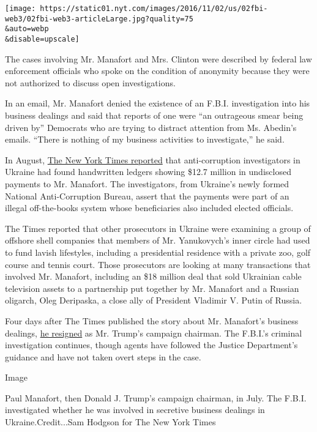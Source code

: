 \texttt{[image: https://static01.nyt.com/images/2016/11/02/us/02fbi-web3/02fbi-web3-articleLarge.jpg?quality=75\\\&auto=webp\\\&disable=upscale]}

The cases involving Mr. Manafort and Mrs. Clinton were described by
federal law enforcement officials who spoke on the condition of
anonymity because they were not authorized to discuss open
investigations.

In an email, Mr. Manafort denied the existence of an F.B.I.
investigation into his business dealings and said that reports of one
were ``an outrageous smear being driven by'' Democrats who are trying to
distract attention from Ms. Abedin's emails. ``There is nothing of my
business activities to investigate,'' he said.

In August,
\href{http://www.nytimes.com/2016/08/15/us/politics/paul-manafort-ukraine-donald-trump.html}{The
New York Times reported} that anti-corruption investigators in Ukraine
had found handwritten ledgers showing \$12.7 million in undisclosed
payments to Mr. Manafort. The investigators, from Ukraine's newly formed
National Anti-Corruption Bureau, assert that the payments were part of
an illegal off-the-books system whose beneficiaries also included
elected officials.

The Times reported that other prosecutors in Ukraine were examining a
group of offshore shell companies that members of Mr. Yanukovych's inner
circle had used to fund lavish lifestyles, including a presidential
residence with a private zoo, golf course and tennis court. Those
prosecutors are looking at many transactions that involved Mr. Manafort,
including an \$18 million deal that sold Ukrainian cable television
assets to a partnership put together by Mr. Manafort and a Russian
oligarch, Oleg Deripaska, a close ally of President Vladimir V. Putin of
Russia.

Four days after The Times published the story about Mr. Manafort's
business dealings,
\href{http://www.nytimes.com/2016/08/20/us/politics/paul-manafort-resigns-donald-trump.html}{he
resigned} as Mr. Trump's campaign chairman. The F.B.I.'s criminal
investigation continues, though agents have followed the Justice
Department's guidance and have not taken overt steps in the case.

Image

Paul Manafort, then Donald J. Trump's campaign chairman, in July. The
F.B.I. investigated whether he was involved in secretive business
dealings in Ukraine.Credit...Sam Hodgson for The New York Times

